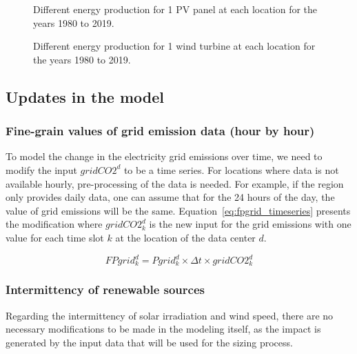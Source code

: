 \begin{figure}[h]
  \centering
  {}
  \caption{Different energy production for 1 PV panel at each location for the years 1980 to 2019.}
  \label{fig:pv_boxplots}
\end{figure}


\begin{figure}[h]
  \centering
  {}
  \caption{Different energy production for 1 wind turbine at each location for the years 1980 to 2019.}
  \label{fig:wt_boxplots}
\end{figure}


\subsection{Updates in the model}

\subsubsection{Fine-grain values of grid emission data (hour by hour)}

To model the change in the electricity grid emissions over time, we need to modify the input $gridCO2^d$ to be a time series. For locations where data is not available hourly, pre-processing of the data is needed. For example, if the region only provides daily data, one can assume that for the 24 hours of the day, the value of grid emissions will be the same. Equation~\eqref{eq:fpgrid_timeseries} presents the modification where $gridCO2^d_k$ is the new input for the grid emissions with one value for each time slot $k$ at the location of the data center $d$.

\begin{equation} \label{eq:fpgrid_timeseries}
FPgrid_k^d = Pgrid_k^d\times \Delta t \times gridCO2^d_k
\end{equation}



\subsubsection{Intermittency of renewable sources}

Regarding the intermittency of solar irradiation and wind speed, there are no necessary modifications to be made in the modeling itself, as the impact is generated by the input data that will be used for the sizing process.



